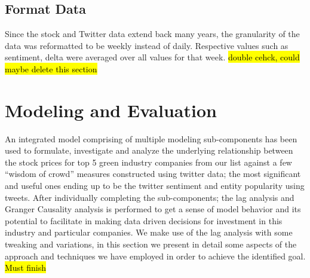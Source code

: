 \documentclass[sigconf, nonacm]{acmart}
\begin{document}
\subsection{Format Data } 
Since the stock and Twitter data extend back many years, the granularity of the data was reformatted to be weekly instead of daily. Respective values such as sentiment, delta were averaged over all values for that week.
\hl{double cehck, could maybe delete this section}

\section{Modeling and Evaluation}
An integrated model comprising of multiple modeling sub-components has been used to formulate, investigate and analyze the underlying relationship between the stock prices for top 5 green industry companies from our list against a few “wisdom of crowd” measures constructed using twitter data; the most significant and useful ones ending up to be the twitter sentiment and entity popularity using tweets. After individually completing the sub-components; the lag analysis and Granger Causality analysis is performed to get a sense of model behavior and its potential to facilitate in making data driven decisions for investment in this industry and particular companies. We make use of the lag analysis with some tweaking and variations, in this section we present in detail some aspects of the approach and techniques we have employed in order to achieve the identified goal.
\hl{Must finish}


\end{document}
